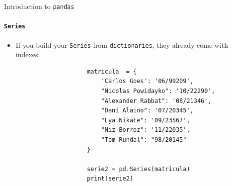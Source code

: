 \documentclass[notes,11pt, aspectratio=169, xcolor=table]{beamer}
\begin{document}
        \begin{frame}[fragile=singleslide]{Introduction to \texttt{pandas}}
        \framesubtitle{\texttt{Series}}
            
             \begin{itemize}
    
                \item If you build your \texttt{Series} from \texttt{dictionaries}, they already come with indexes:
    
                    \begin{verbatim}
                    matricula  = {
                        'Carlos Goes': '06/99209',
                        "Nicolas Powidayko": '10/22290',
                        "Alexander Rabbat": '08/21346',
                        "Dani Alaino": '07/20345',
                        "Lya Nikate": '09/23567',
                        "Niz Borroz": '11/22035',
                        "Tom Rundal": "98/20145"
                    }
                    
                    serie2 = pd.Series(matricula)
                    print(serie2)

                    \end{verbatim}
                
                    
            \end{itemize}             
    
        \end{frame}    
\end{document}
